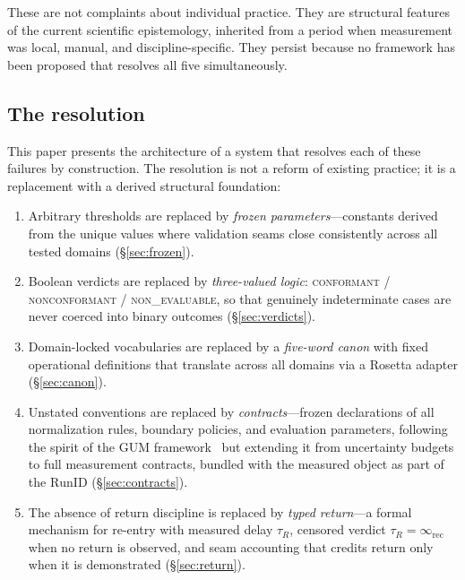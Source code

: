 \documentclass[
  aps,
  prd,
  twocolumn,
  superscriptaddress,
  nofootinbib,
  floatfix
]{revtex4-2}
\newcommand{\tR}{\tau_{\!R}}
\newcommand{\IR}{\infty_{\mathrm{rec}}}
\newcommand{\regime}[1]{\textrm{\upshape\scshape#1}}
\newcommand{\conform}{\regime{conformant}}
\newcommand{\nonconform}{\regime{nonconformant}}
\newcommand{\RunID}{\mathrm{RunID}}
\begin{document}
These are not complaints about individual practice.  They are
structural features of the current scientific epistemology,
inherited from a period when measurement was local, manual, and
discipline-specific.  They persist because no framework has been
proposed that resolves all five simultaneously.

\subsection{The resolution}

This paper presents the architecture of a system that resolves
each of these failures by construction.  The resolution is not a
reform of existing practice; it is a replacement with a derived
structural foundation:

\begin{enumerate}[leftmargin=*,label=(\roman*)]
\item Arbitrary thresholds are replaced by \emph{frozen
  parameters}---constants derived from the unique values
  where validation seams close consistently across all
  tested domains (\S\ref{sec:frozen}).

\item Boolean verdicts are replaced by \emph{three-valued logic}:
  \conform{} / \nonconform{} / \regime{non\_evaluable}, so that
  genuinely indeterminate cases are never coerced into binary
  outcomes (\S\ref{sec:verdicts}).

\item Domain-locked vocabularies are replaced by a
  \emph{five-word canon} with fixed operational definitions
  that translate across all domains via a Rosetta adapter
  (\S\ref{sec:canon}).

\item Unstated conventions are replaced by \emph{contracts}---frozen
  declarations of all normalization rules, boundary policies, and
  evaluation parameters, following the spirit of the GUM
  framework~\cite{jcgm2008gum,nist1994uncertainty} but extending it
  from uncertainty budgets to full measurement contracts, bundled
  with the measured object as part of the $\RunID$
  (\S\ref{sec:contracts}).

\item The absence of return discipline is replaced by
  \emph{typed return}---a formal mechanism for re-entry with
  measured delay $\tR$, censored verdict $\tR = \IR$ when no
  return is observed, and seam accounting that credits return only
  when it is demonstrated (\S\ref{sec:return}).
\end{enumerate}
\end{document}
